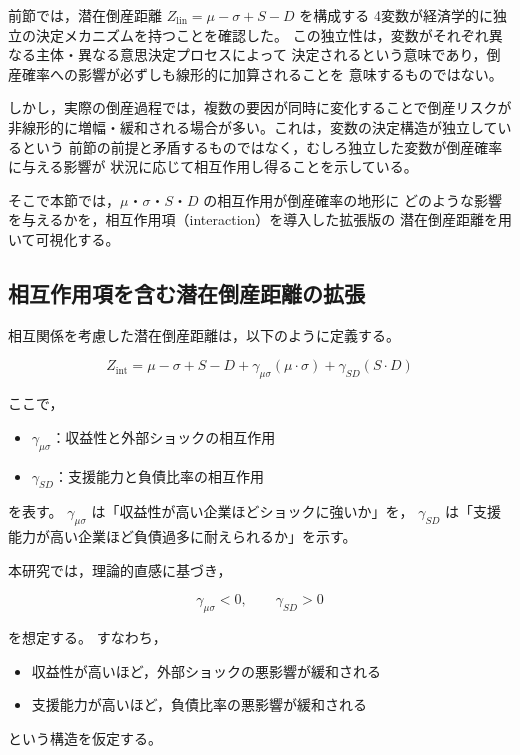 前節では，潜在倒産距離 $Z_{\text{lin}} = \mu - \sigma + S - D$ を構成する
4変数が経済学的に独立の決定メカニズムを持つことを確認した。
この独立性は，変数がそれぞれ異なる主体・異なる意思決定プロセスによって
決定されるという意味であり，倒産確率への影響が必ずしも線形的に加算されることを
意味するものではない。

しかし，実際の倒産過程では，複数の要因が同時に変化することで倒産リスクが
非線形的に増幅・緩和される場合が多い。これは，変数の決定構造が独立しているという
前節の前提と矛盾するものではなく，むしろ独立した変数が倒産確率に与える影響が
状況に応じて相互作用し得ることを示している。

そこで本節では，$\mu$・$\sigma$・$S$・$D$ の相互作用が倒産確率の地形に
どのような影響を与えるかを，相互作用項（interaction）を導入した拡張版の
潜在倒産距離を用いて可視化する。

\subsection*{相互作用項を含む潜在倒産距離の拡張}

相互関係を考慮した潜在倒産距離は，以下のように定義する。



\[
Z_{\text{int}} 
= \mu - \sigma + S - D 
+ \gamma_{\mu\sigma} (\mu \cdot \sigma)
+ \gamma_{SD} (S \cdot D)
\]



ここで，
\begin{itemize}
    \item $\gamma_{\mu\sigma}$：収益性と外部ショックの相互作用
    \item $\gamma_{SD}$：支援能力と負債比率の相互作用
\end{itemize}
を表す。
$\gamma_{\mu\sigma}$ は「収益性が高い企業ほどショックに強いか」を，
$\gamma_{SD}$ は「支援能力が高い企業ほど負債過多に耐えられるか」を示す。

本研究では，理論的直感に基づき，



\[
\gamma_{\mu\sigma} < 0,\qquad \gamma_{SD} > 0
\]



を想定する。
すなわち，
\begin{itemize}
    \item 収益性が高いほど，外部ショックの悪影響が緩和される
    \item 支援能力が高いほど，負債比率の悪影響が緩和される
\end{itemize}
という構造を仮定する。

